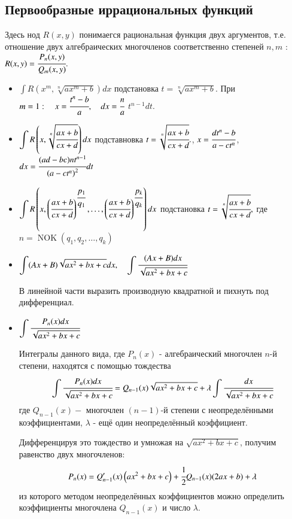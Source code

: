 \documentclass[twoside, a4paperpt, fleqn]{extarticle}
\begin{document}
\subsection*{Первообразные иррациональных функций}
Здесь нод $R(x, y)$ понимаегся рациональная функция двух аргументов, т.е. отношение двух алгебраических многочленов соответственно степеней $n, m$ :
$R(x, y)=\cfrac{P_{n}(x, y)}{Q_{m}(x, y)} .$

\begin{itemize}
    \item $\displaystyle \int R(x^m, \sqrt[n]{a x^m +b}) d x$ подстановка $t = \sqrt[n]{a x^m +b}$. При $m = 1: \quad x=\cfrac{t^{n}-b}{a}, \quad d x=\cfrac{n}{a}$ $t^{n-1} d t $.
    \item $\displaystyle \int R\left(x, \sqrt[n]{\cfrac{a x+b}{c x+d}}\right) d x$ подставновка $t=\sqrt[n]{\cfrac{a x+b}{c x+d}} .$, $x=\cfrac{d t^{n}-b}{a-c t^{n}}$, $d x=\cfrac{(a d-b c) n t^{n-1}}{\left(a-c t^{n}\right)^{2}} d t$
    \item $\displaystyle \int R\left(x,\left(\cfrac{a x+b}{c x+d}\right)^{\cfrac{p_{1}}{q_{1}}}, \ldots,\left(\cfrac{a x+b}{c x+d}\right)^{\cfrac{p_{k}}{q_{k}}}\right) d x$  подстановка $t=\sqrt[n]{\cfrac{a x+b}{c x+d}}, $ где $ n=\operatorname{NOK}\left(q_{1}, q_{2}, \ldots, q_{k}\right)$
    
    \item $\displaystyle \int(A x+B) \sqrt{a x^{2}+b x+c} d x, \quad \displaystyle \int \cfrac{(A x+B) d x}{\sqrt{a x^{2}+b x+c}}$ 
    
    В линейной части выразить производную квадратной и пихнуть под дифференциал.

    \item $\displaystyle \int \cfrac{P_{n}(x) d x}{\sqrt{a x^{2}+b x+c}}$
    
    Интегралы данного вида, где $P_{n}(x)$ - алгебраический многочлен $n$-й степени, находятся с помощью тождества
    $$
    \displaystyle \int \cfrac{P_{n}(x) d x}{\sqrt{a x^{2}+b x+c}}=Q_{n-1}(x) \sqrt{a x^{2}+b x+c}+\lambda \displaystyle \int \cfrac{d x}{\sqrt{a x^{2}+b x+c}}
    $$
    где $Q_{n-1}(x)-$ многочлен $(n-1)$-й степени с неопределёнными коэффициентами, $\lambda$ - ещё один неопределённый коэффициент. 
    
    Дифференцируя это тождество и умножая на $\sqrt{a x^{2}+b x+c}$, получим равенство двух многочленов:
    $$
    P_{n}(x)=Q_{n-1}^{\prime}(x)\left(a x^{2}+b x+c\right)+\cfrac{1}{2} Q_{n-1}(x)(2 a x+b)+\lambda
    $$
    из которого методом неопределённых коэффициентов можно определить коэффициенты многочлена $Q_{n-1}(x)$ и число $\lambda$.


\end{itemize}
\end{document}
